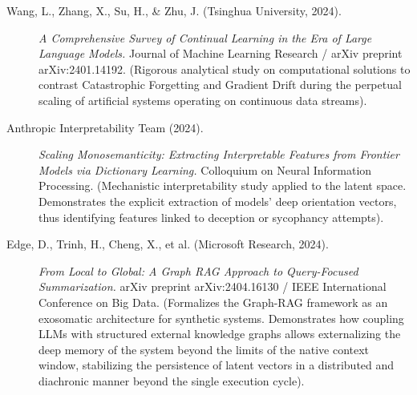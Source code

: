 \documentclass[11pt,a4paper,oneside]{article} %
\begin{document}
\hypertarget{a1.6-regularized-continual-learning-catastrophic-forgetting-and-gradient-drift}{%
\label{a1.6-regularized-continual-learning-catastrophic-forgetting-and-gradient-drift}}

\begin{description}
\item[Wang, L., Zhang, X., Su, H., \& Zhu, J. (Tsinghua University, 2024).] \emph{A Comprehensive Survey of Continual Learning in the Era of Large Language Models.} Journal of Machine Learning Research / arXiv preprint arXiv:2401.14192. (Rigorous analytical study on computational solutions to contrast Catastrophic Forgetting and Gradient Drift during the perpetual scaling of artificial systems operating on continuous data streams).
\end{description}

\hypertarget{a1.7-theory-of-mind-interpretability-and-cross-agent-alignment}{%
\label{a1.7-theory-of-mind-interpretability-and-cross-agent-alignment}}

\begin{description}
\item[Anthropic Interpretability Team (2024).] \emph{Scaling Monosemanticity: Extracting Interpretable Features from Frontier Models via Dictionary Learning.} Colloquium on Neural Information Processing. (Mechanistic interpretability study applied to the latent space. Demonstrates the explicit extraction of models' deep orientation vectors, thus identifying features linked to deception or sycophancy attempts).
\end{description}

\hypertarget{a1.8-externalized-computation-graph-rag-and-continuum-memory-systems}{%
\label{a1.8-externalized-computation-graph-rag-and-continuum-memory-systems}}

\begin{description}
\item[Edge, D., Trinh, H., Cheng, X., et al. (Microsoft Research, 2024).] \emph{From Local to Global: A Graph RAG Approach to Query-Focused Summarization.} arXiv preprint arXiv:2404.16130 / IEEE International Conference on Big Data. (Formalizes the Graph-RAG framework as an exosomatic architecture for synthetic systems. Demonstrates how coupling LLMs with structured external knowledge graphs allows externalizing the deep memory of the system beyond the limits of the native context window, stabilizing the persistence of latent vectors in a distributed and diachronic manner beyond the single execution cycle).
\end{description}
\end{document}
